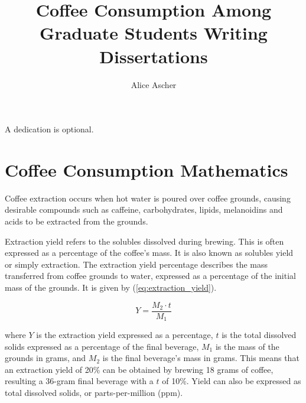 \documentclass{uofithesis}
\title{Coffee Consumption Among Graduate Students Writing Dissertations}
\author{Alice Ascher}
\begin{document}
\maketitle



\begin{dedication}
    A dedication is optional.
\end{dedication}

\tableofcontents

\section{Coffee Consumption Mathematics}

Coffee extraction occurs when hot water is poured over coffee grounds, causing
desirable compounds such as caffeine, carbohydrates, lipids, melanoidins and
acids to be extracted from the grounds.

Extraction yield refers to the solubles dissolved during brewing. This is often
expressed as a percentage of the coffee's mass. It is also known as solubles
yield or simply extraction. The extraction yield percentage describes the mass
transferred from coffee grounds to water, expressed as a percentage of the
initial mass of the grounds. It is given by (\ref{eq:extraction_yield}).

\begin{equation}\label{eq:extraction_yield}
    Y = \frac{M_2 \cdot t}{M_1}
\end{equation}

where $Y$ is the extraction yield expressed as a percentage, $t$ is the total
dissolved solids expressed as a percentage of the final beverage, $M_1$ is the
mass of the grounds in grams, and $M_2$ is the final beverage's mass in grams.
This means that an extraction yield of 20\% can be obtained by brewing 18 grams
of coffee, resulting a 36-gram final beverage with a $t$ of 10\%. Yield can also
be expressed as total dissolved solids, or parts-per-million (ppm).
\end{document}
